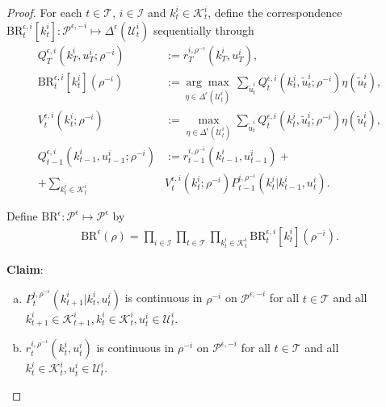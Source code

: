 \documentclass[pdflatex,sn-basic]{sn-jnl}
\newcommand{\Qfunc}{Q}
\newcommand{\comp}{k}
\newcommand{\Compset}{\mathcal{K}}
\theoremstyle{thmstyleone}%
\theoremstyle{thmstyletwo}%
\theoremstyle{thmstylethree}%
\begin{document}
\begin{appendices}
\begin{proof}
	For each $t\in\mathcal{T}$, $i\in\mathcal{I}$ and $\comp_t^i\in\Compset_t^i$, define the correspondence $\mathrm{BR}_t^{\epsilon, i}[\comp_t^i]: \mathcal{P}^{\epsilon, -i} \mapsto \Delta^\epsilon(\mathcal{U}_t^i)$ sequentially through %
 \begin{subequations}\label{defofBR}
		\begin{align}
			\Qfunc_{T}^{\epsilon, i}(\comp_T^i, u_T^i;\rho^{-i})&:=r_T^{i, \rho^{-i}}(\comp_T^i, u_T^i)\label{defofBR:ini}, \\
			\mathrm{BR}_t^{\epsilon, i}[\comp_t^i](\rho^{-i}) &:= \underset{\eta\in \Delta^\epsilon(\mathcal{U}_t^i)}{\arg\max}~ \sum_{\tilde{u}_t^i}  \Qfunc_t^{\epsilon, i}(\comp_t^i, \tilde{u}_t^i;\rho^{-i}) \eta(\tilde{u}_t^i),\label{defofBR:BR} \\
			V_t^{\epsilon, i}(\comp_t^i;\rho^{-i})&:=\max_{\eta\in \Delta^\epsilon(\mathcal{U}_t^i)} \sum_{\tilde{u}_t^i}  \Qfunc_t^{\epsilon, i}(\comp_t^i, \tilde{u}_t^i;\rho^{-i}) \eta(\tilde{u}_t^i), \label{defofBR:V}\\
			\Qfunc_{t-1}^{\epsilon, i}(\comp_{t-1}^i, u_{t-1}^i; \rho^{-i})&:=r_{t-1}^{i, \rho^{-i}}(\comp_{t-1}^i, u_{t-1}^i) +\label{defofBR:K}\\
			+ \sum_{\comp_{t}^i\in\Compset_{t}^i } &V_{t}^{\epsilon, i}(\comp_t^i ; \rho^{-i}) P_{t-1}^{i, \rho^{-i}}(\comp_{t}^i|\comp_{t-1}^i, u_t^i).
		\end{align}
	\end{subequations}
	
	
	Define $\mathrm{BR}^{\epsilon}: \mathcal{P}^\epsilon \mapsto \mathcal{P}^\epsilon$ by
	\begin{align}
		\mathrm{BR}^{\epsilon}(\rho) = \prod_{i\in\mathcal{I}} \prod_{t\in\mathcal{T}} \prod_{\comp_t^i\in\Compset_t^i} \mathrm{BR}_t^{\epsilon, i}[\comp_t^i](\rho^{-i}).
	\end{align}
	
	\textbf{Claim}:
	\begin{enumerate}[(a)]
		\item $P_t^{i, \rho^{-i}}(\comp_{t+1}^i|\comp_{t}^i, u_t^i)$ is continuous in $\rho^{-i}$ on $\mathcal{P}^{\epsilon, -i}$ for all $t\in\mathcal{T}$ and all $\comp_{t+1}^i\in\Compset_{t+1}^i, \comp_t^i\in\Compset_t^i, u_t^i\in\mathcal{U}_t^i$.
		\item $r_t^{i, \rho^{-i}}(\comp_t^i, u_t^i)$ is continuous in $\rho^{-i}$ on $\mathcal{P}^{\epsilon, -i}$ for all $t\in\mathcal{T}$ and all $\comp_t^i\in\Compset_t^i, u_t^i\in\mathcal{U}_t^i$.
	\end{enumerate}
	

\end{proof}
\end{appendices}
\end{document}

